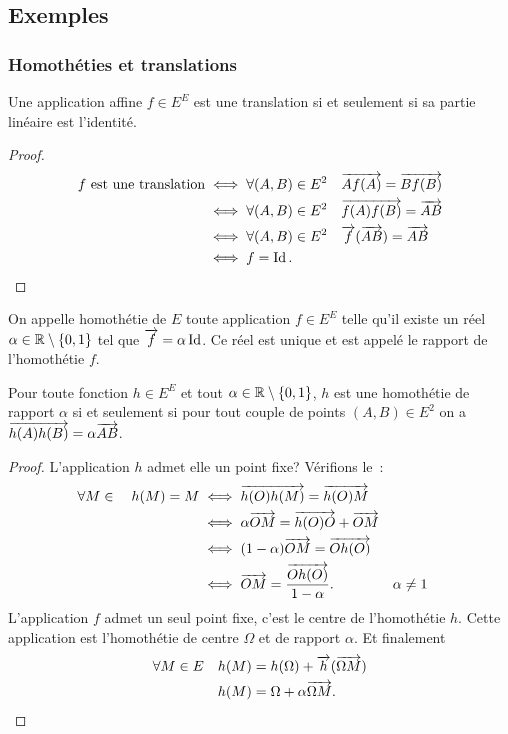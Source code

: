 \subsection{Exemples}

\subsubsection{Homothéties et translations}

\begin{prop}
  Une application affine \(f \in E^E\) est une translation si et seulement si sa
  partie linéaire est l'identité.
\end{prop}
\begin{proof}
  \begin{align*}
    f \text{~est une translation} &\iff \forall (A,B) \in E^2 \quad \overrightarrow{Af(A)}
    = \overrightarrow{Bf(B)} \\
    &\iff \forall (A,B) \in E^2 \quad \overrightarrow{f(A)f(B)} = \overrightarrow{AB} \\
    &\iff \forall (A,B) \in E^2 \quad \overrightarrow{f}(\overrightarrow{AB}) = \overrightarrow{AB} \\
    &\iff f=\operatorname{Id}.
  \end{align*}
\end{proof}

\begin{defdef}
  On appelle homothétie de \(E\) toute application \(f \in E^E\) telle qu'il
  existe un réel \(\alpha \in \mathbb{R}\setminus\{0, 1\}\) tel que \(\overrightarrow{f}=\alpha
  \operatorname{Id}\). Ce réel est unique et est appelé le rapport de l'homothétie \(f\).
\end{defdef}
\begin{prop}
  Pour toute fonction \(h \in E^E\) et tout \(\alpha \in \mathbb{R}\setminus\{0, 1\}\),
  \(h\) est une homothétie de rapport \(\alpha\) si et seulement si pour tout
  couple de points \((A, B) \in E^2\) on a \(\overrightarrow{h(A)h(B)}=\alpha \overrightarrow{AB}\).
\end{prop}
\begin{proof}
  L'application \(h\) admet elle un point fixe? Vérifions le~:
  \begin{align*}
    \forall M \in \quad h(M) = M &\iff \overrightarrow{h(O)h(M)} = \overrightarrow{h(O)M} \\
    &\iff \alpha \overrightarrow{OM} =\overrightarrow{h(O)O} +\overrightarrow{OM} \\
    &\iff (1-\alpha) \overrightarrow{OM} = \overrightarrow{Oh(O)} \\
    &\iff \overrightarrow{OM} = \frac{\overrightarrow{Oh(O)}}{1-\alpha}. && \alpha \neq 1
  \end{align*}
  L'application \(f\) admet un seul point fixe, c'est le centre de l'homothétie
  \(h\). Cette application est l'homothétie de centre \(\Omega\) et de rapport
  \(\alpha\). Et finalement
  \begin{align*}
    \forall M \in E \quad h(M) &= h(\Omega)+\overrightarrow{h}(\overrightarrow{\Omega M}) \\
    h(M) &=  \Omega +\alpha \overrightarrow{\Omega M}.
  \end{align*}
\end{proof}

